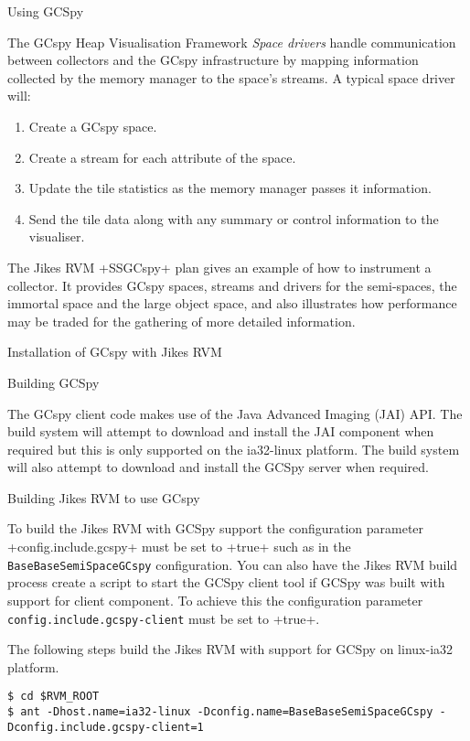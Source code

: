 \begin{section}{Using GCSpy}
\begin{subsection}{The GCspy Heap Visualisation Framework}
\textit{Space drivers} handle communication between collectors and the GCspy infrastructure by mapping information collected by the memory manager to the space's streams. A typical space driver will:
\begin{enumerate}
  \item Create a GCspy space.
  \item Create a stream for each attribute of the space.
  \item Update the tile statistics as the memory manager passes it information.
  \item Send the tile data along with any summary or control information to the visualiser.
\end{enumerate}

The Jikes RVM \spverb+SSGCspy+ plan gives an example of how to instrument a collector. It provides GCspy spaces, streams and drivers for the semi-spaces, the immortal space and the large object space, and also illustrates how performance may be traded for the gathering of more detailed information.

\end{subsection}

\begin{subsection}{Installation of GCspy with Jikes RVM}

\begin{subsubsection}{Building GCSpy}

The GCspy client code makes use of the Java Advanced Imaging (JAI) API. The build system will attempt to download and install the JAI component when required but this is only supported on the ia32-linux platform. The build system will also attempt to download and install the GCSpy server when required.

\end{subsubsection}

\begin{subsubsection}{Building Jikes RVM to use GCspy}

To build the Jikes RVM with GCSpy support the configuration parameter \spverb+config.include.gcspy+ must be set to \spverb+true+ such as in the \texttt{BaseBaseSemiSpaceGCspy} configuration. You can also have the Jikes RVM build process create a script to start the GCSpy client tool if GCSpy was built with support for client component. To achieve this the configuration parameter \texttt{con\-fig.in\-clu\-de.gc\-spy-client} must be set to \spverb+true+.

The following steps build the Jikes RVM with support for GCSpy on linux-ia32 platform.
\begin{lstlisting}
$ cd $RVM_ROOT
$ ant -Dhost.name=ia32-linux -Dconfig.name=BaseBaseSemiSpaceGCspy -Dconfig.include.gcspy-client=1
\end{lstlisting}


\end{subsubsection}
\end{subsection}
\end{section}
